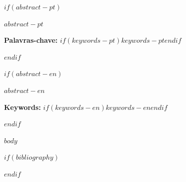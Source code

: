 \documentclass[
  $if(lang)$$lang$$else$brazil$endif$,
  article,
  12pt,
  oneside,
  a4paper
]{abntex2}
\begin{document}
\frenchspacing
\maketitle

$if(abstract-pt)$
\begin{resumoumacoluna}
$abstract-pt$

\vspace{\onelineskip}
\noindent
\textbf{Palavras-chave:} $if(keywords-pt)$$keywords-pt$$endif$
\end{resumoumacoluna}
$endif$

$if(abstract-en)$
\renewcommand{\resumoname}{Abstract}
\begin{resumoumacoluna}
$abstract-en$

\vspace{\onelineskip}
\noindent
\textbf{Keywords:} $if(keywords-en)$$keywords-en$$endif$
\end{resumoumacoluna}
$endif$

\textual

$body$

\postextual

$if(bibliography)$


$endif$
\end{document}
